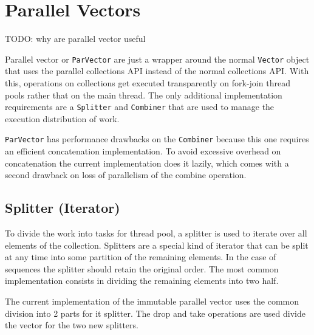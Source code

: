 
\section{Parallel Vectors}
\color{red}TODO: why are parallel vector useful\color{black}

Parallel vector or \texttt{ParVector} are just a wrapper around the normal \texttt{Vector} object that uses the parallel collections API instead of the normal collections API. With this, operations on collections get executed transparently on fork-join thread pools rather that on the main thread. The only additional implementation requirements are a \texttt{Splitter} and \texttt{Combiner} that are used to manage the execution distribution of work. 

\texttt{ParVector} has performance drawbacks on the \texttt{Combiner} because this one requires an efficient concatenation implementation. To avoid excessive overhead on concatenation the current implementation does it lazily, which comes with a second drawback on loss of parallelism of the combine operation.


\subsection{Splitter (Iterator)}
To divide the work into tasks for thread pool, a splitter is used to iterate over all elements of the collection. Splitters are a special kind of iterator that can be split at any time into some partition of the remaining elements. In the case of sequences the splitter should retain the original order. The most common implementation consists in dividing the remaining elements into two half. 

The current implementation of the immutable parallel  vector \cite{scalaParVector211}  uses the common division into 2 parts for it splitter. The drop and take operations are used divide the vector for the two new splitters.


